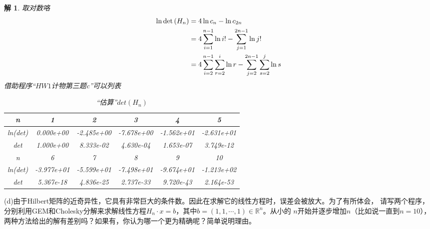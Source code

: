 \documentclass[10pt]{ctexart}
\newtheorem*{solution}{解}
\begin{document}
\begin{solution}
    取对数咯
    \begin{align}
    \ln{\det{(H_n)}}&=4\ln {c_n}-\ln{c_{2n}}\notag\\
    &=4\sum\limits_{i=1}^{n-1}\ln{i!}-\sum\limits_{j=1}^{2n-1}\ln{j!}\notag\\
    &=4\sum\limits_{i=2}^{n-1}\sum\limits_{r=2}^{i}\ln{r}-\sum\limits_{j=2}^{2n-1}\sum\limits_{s=2}^{j}\ln{s}\notag
    \end{align}
    借助程序“$HW1$计物第三题c”可以列表
    \begin{table}[h]
        \centering
        \begin{tabular}{cccccc}
            \toprule
            n & 1 & 2 & 3 & 4 & 5\\
            \midrule
            ln(det) & 0.000e+00 & -2.485e+00 & -7.678e+00 & -1.562e+01 & -2.631e+01\\
            det & 1.000e+00 & 8.333e-02 & 4.630e-04 & 1.653e-07 & 3.749e-12\\
            \bottomrule
            \toprule
            n & 6 & 7 & 8 & 9 & 10\\
            \midrule
            ln(det) & -3.977e+01 & -5.599e+01 & -7.498e+01 & -9.674e+01 & -1.213e+02\\
            det & 5.367e-18 & 4.836e-25 & 2.737e-33 & 9.720e-43 & 2.164e-53\\
            \bottomrule
        \end{tabular}
        \caption{“估算”$det(H_n)$}
    \end{table}
\end{solution}
(d)由于Hilbert矩阵的近奇异性，它具有非常巨大的条件数。因此在求解它的线性方程时，误差会被放大。为了有所体会，
请写两个程序，分别利用GEM和Cholesky分解来求解线性方程$H_n\cdot x=b$，其中$b=(1,1,\cdots,1)\in\mathbb{R}^n$。从小的
$n$开始并逐步增加$n$（比如说一直到$n=10$），两种方法给出的解有差别吗？如果有，你认为哪一个更为精确呢？简单说明理由。
\end{document}
